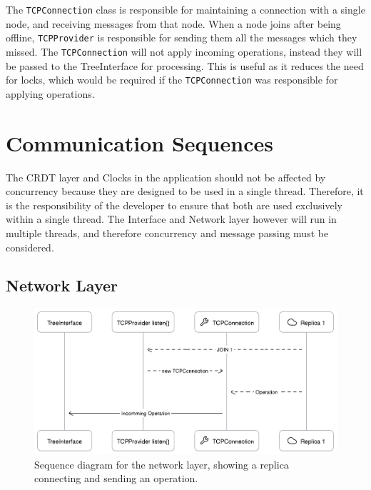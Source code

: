 \documentclass[12pt]{report}
\begin{document}
The \texttt{TCPConnection} class is responsible for maintaining a connection with a single node, and receiving messages from that node. When a node joins after being offline, \texttt{TCPProvider} is responsible for sending them all the messages which they missed. The \texttt{TCPConnection} will not apply incoming operations, instead they will be passed to the TreeInterface for processing. This is useful as it reduces the need for locks, which would be required if the \texttt{TCPConnection} was responsible for applying operations. \par 

\section{Communication Sequences}
The CRDT layer and Clocks in the application should not be affected by concurrency because they are designed to be used in a single thread. Therefore, it is the responsibility of the developer to ensure that both are used exclusively within a single thread. The Interface and Network layer however will run in multiple threads, and therefore concurrency and message passing must be considered. \par

\subsection{Network Layer}

\begin{figure}[h]
    \centering
    \includegraphics[width=1\textwidth]{images/networkjoin.png}
    \caption{Sequence diagram for the network layer, showing a replica connecting and sending an operation.}
    \label{fig:networkjoin}
\end{figure} 
\end{document}
